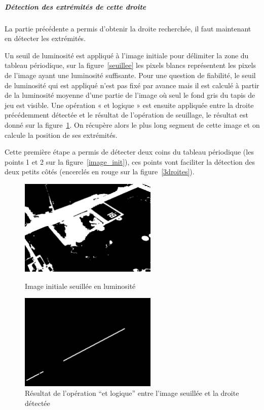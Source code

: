 \documentclass{article}
\begin{document}
\subparagraph{Détection des extrémités de cette droite}
La partie précédente a permis d’obtenir la droite recherchée, il faut maintenant en détecter les extrémités.

Un seuil de luminosité est appliqué à l’image initiale pour délimiter la zone du tableau périodique, sur la figure~\ref{seuillee} les pixels blancs
représentent les pixels de l’image ayant une luminosité suffisante. Pour une question de fiabilité, le seuil de luminosité qui est
appliqué n’est pas fixé par avance mais il est calculé à partir de la luminosité moyenne d’une partie de l’image où seul le fond gris
du tapis de jeu est visible.
Une opération « et logique » est ensuite appliquée entre la droite précédemment détectée et le résultat de l’opération de seuillage,
le résultat est donné sur la figure~\ref{droite1}. On récupère alors le plus long segment de cette image et on calcule la position de ses extrémités.

Cette première étape a permis de détecter deux coins du tableau périodique (les points 1 et 2 sur la figure~\ref{image_init}), ces points vont
faciliter la détection des deux petits côtés (encerclés en rouge sur la figure~\ref{3droites}).
\begin{figure}[!h] \hfill
   \begin{minipage}[t]{.4\linewidth}
      \begin{center}
      \includegraphics[height=130pt]{image_seuillee_en_luminosite.png}  
      \end{center}
      \caption{Image initiale seuillée en luminosité}
      \label{seuillee}
   \end{minipage} \hfill
   \begin{minipage}[t]{.4\linewidth}
      \begin{center}
      \includegraphics[height=130pt]{image_droite_1.png}  
      \end{center}
      \caption{Résultat de l'opération ``et logique'' entre l'image seuillée et la droite détectée}
      \label{droite1}
   \end{minipage} \hfill \hfill
\end{figure}
\end{document}
